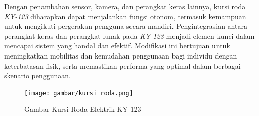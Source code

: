 Dengan penambahan sensor, kamera, dan perangkat keras lainnya, kursi roda \emph{KY-123} diharapkan dapat menjalankan fungsi otonom, termasuk kemampuan untuk mengikuti pergerakan pengguna secara mandiri. Pengintegrasian antara perangkat keras dan perangkat lunak pada \emph{KY-123} menjadi elemen kunci dalam mencapai sistem yang handal dan efektif. Modifikasi ini bertujuan untuk meningkatkan mobilitas dan kemudahan penggunaan bagi individu dengan keterbatasan fisik, serta memastikan performa yang optimal dalam berbagai skenario penggunaan.

\begin{figure}[H]
  \centering
  \texttt{[image: gambar/kursi roda.png]}
  \caption{Gambar Kursi Roda Elektrik KY-123}
  \label{fig:Gambar Kursi Roda Elektrik KY-123}
\end{figure}